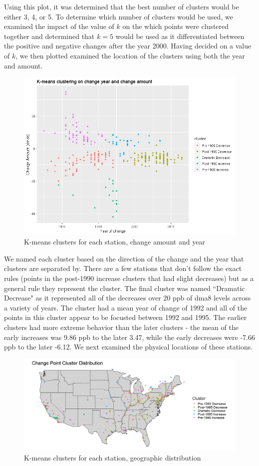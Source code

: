 \documentclass[11pt, oneside]{article}
\theoremstyle{definition}
\begin{document}
Using this plot, it was determined that the best number of clusters would be either 3, 4, or 5. To determine which number of clusters would be used, we examined the impact of the value of $k$ on the which points were clustered together and determined that $k=5$ would be used as it differentiated between the positive and negative changes after the year 2000. Having decided on a value of $k$, we then plotted examined the location of the clusters using both the year and amount.

\begin{figure}[H]
    \centering
    \includegraphics[width=0.7\linewidth]{plots/clustering/year_amount_clusters.png}
    \caption{K-means clusters for each station, change amount and year}
    \label{k_means}
\end{figure}

We named each cluster based on the direction of the change and the year that clusters are separated by. There are a few stations that don't follow the exact rules (points in the post-1990 increase clusters that had slight decreases) but as a general rule they represent the cluster. The final cluster was named ``Dramatic Decrease" as it represented all of the decreases over 20 ppb of dma8 levels across a variety of years. The cluster had a mean year of change of 1992 and all of the points in this cluster appear to be focusted between 1992 and 1995. The earlier clusters had more extreme behavior than the later clusters - the mean of the early increases was 9.86 ppb to the later 3.47, while the early decreases were -7.66 ppb to the later -6.12. We next examined the physical locations of these stations.


\begin{figure}[H]
    \centering
    \includegraphics[width=\linewidth]{plots/clustering/spatial_cluster_all.png}
    \caption{K-means clusters for each station, geographic distribution}
    \label{k_means_geo}
\end{figure}
\end{document}
